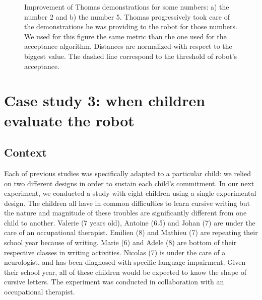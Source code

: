 \documentclass[conference]{IEEEtran}
\begin{document}
\begin{figure}
    \centering
    \caption{\small Improvement of Thomas demonstrations for some numbers: a) the number 2 and b) the number 5. Thomas progressively took care of the demonstrations he was providing to the robot for those numbers. We used for this figure the same metric than the one used for the acceptance algorithm. Distances are normalized with respect to the biggest value. The dashed line correspond to the threshold of robot's acceptance.}

    \label{Thomas_progress}
\end{figure}

\section{Case study 3: when children evaluate the robot}\label{auto}

\subsection{Context}

Each of previous studies was specifically adapted to a particular child: we relied on two different
designs in order to sustain each child's commitment.
In our next experiment, we conducted a study with eight children using a single experimental design. The children all have in common difficulties to learn
cursive writing but the nature and magnitude of these troubles are significantly
different from one child to another. Valerie (7 years old), Antoine (6.5) and
Johan (7) are under the care of an
occupational therapist. Emilien (8) and Mathieu (7) are repeating their school year
because of writing. Marie (6) and Adele (8) are bottom of their respective
classes in writing activities. Nicolas (7) is under the care of a neurologist, and
has been diagnosed with specific language impairment. Given their school year, all of these children would be
expected to know the shape of
cursive letters. The experiment was conducted in collaboration with an occupational therapist. 
\end{document}
